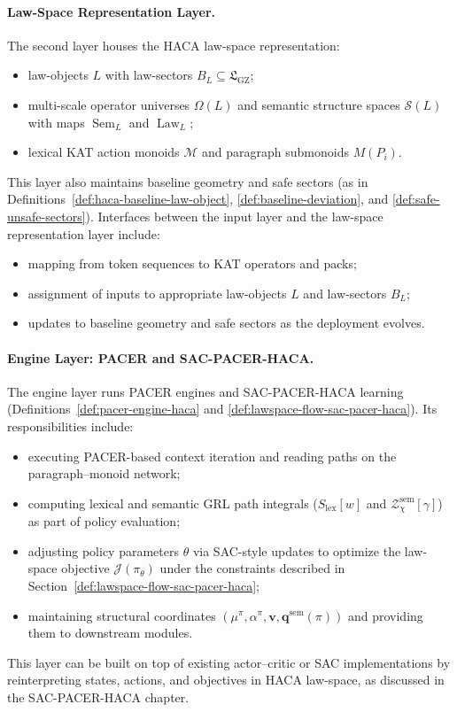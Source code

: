 \documentclass[11pt]{book}
\theoremstyle{plain}
\theoremstyle{definition}
\theoremstyle{remark}
\newcommand{\GZLS}{\ensuremath{\mathfrak{L}_{\mathrm{GZ}}}}       \newcommand{\GZLT}{\ensuremath{M_{!w}}}                           \newcommand{\GZLOC}{\ensuremath{A_M}}                             \newcommand{\GZLC}{\ensuremath{\omega_{\mathrm{law}}}}            \newcommand{\GZLCurv}{\ensuremath{\mathcal{F}_{\mathrm{law}}}}
\begin{document}
\paragraph{Law-Space Representation Layer.}
The second layer houses the HACA law-space representation:
\begin{itemize}
  \item law-objects $L$ with law-sectors $B_L\subseteq\GZLS$;
  \item multi-scale operator universes $\Omega(L)$ and semantic
        structure spaces $\mathcal{S}(L)$ with maps
        $\operatorname{Sem}_L$ and $\operatorname{Law}_L$;
  \item lexical KAT action monoids $\mathcal{M}$ and paragraph
        submonoids $M(P_i)$.
\end{itemize}
This layer also maintains baseline geometry and safe sectors (as in
Definitions~\ref{def:haca-baseline-law-object},
\ref{def:baseline-deviation}, and
\ref{def:safe-unsafe-sectors}). Interfaces between the input layer
and the law-space representation layer include:
\begin{itemize}
  \item mapping from token sequences to KAT operators and packs;
  \item assignment of inputs to appropriate law-objects $L$ and
        law-sectors $B_L$;
  \item updates to baseline geometry and safe sectors as the
        deployment evolves.
\end{itemize}

\paragraph{Engine Layer: PACER and SAC-PACER-HACA.}
The engine layer runs PACER engines and SAC-PACER-HACA learning
(Definitions~\ref{def:pacer-engine-haca} and
\ref{def:lawspace-flow-sac-pacer-haca}). Its responsibilities include:
\begin{itemize}
  \item executing PACER-based context iteration and reading paths on
        the paragraph–monoid network;
  \item computing lexical and semantic GRL path integrals
        ($S_{\mathrm{lex}}[w]$ and $\mathcal{Z}^{\mathrm{sem}}_\chi[\gamma]$)
        as part of policy evaluation;
  \item adjusting policy parameters $\theta$ via SAC-style updates to
        optimize the law-space objective $\mathcal{J}(\pi_\theta)$
        under the constraints described in
        Section~\ref{def:lawspace-flow-sac-pacer-haca};
  \item maintaining structural coordinates
        $(\mu^\pi,\alpha^\pi,\mathbf{v},\mathbf{q}^{\mathrm{sem}}(\pi))$
        and providing them to downstream modules.
\end{itemize}
This layer can be built on top of existing actor–critic or SAC
implementations by reinterpreting states, actions, and objectives in
HACA law-space, as discussed in the SAC-PACER-HACA chapter.
\end{document}
